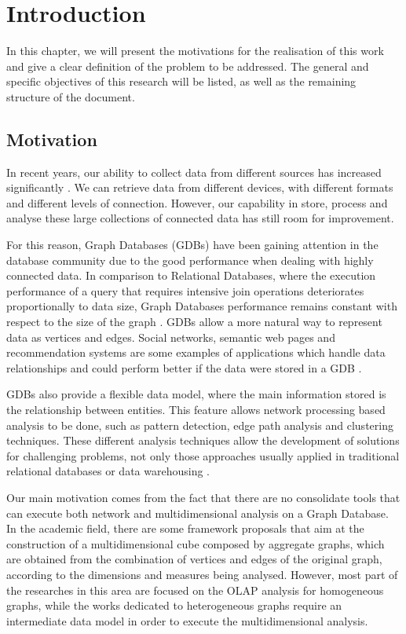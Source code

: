 \chapter{Introduction}
In this chapter, we will present the motivations for the realisation of this work and give a clear definition of the problem to be addressed. The general and specific objectives of this research will be listed, as well as the remaining structure of the document.

\section{Motivation}
In recent years, our ability to collect data from different sources has increased significantly \cite{fan2013mining}. We can retrieve data from different devices, with different formats and different levels of connection. However, our capability in store, process and analyse these large collections of connected data has still room for improvement.

For this reason, Graph Databases (GDBs) have been gaining attention in the database community due to the good performance when dealing with highly connected data. In comparison to Relational Databases, where the execution performance of a query that requires intensive join operations deteriorates proportionally to data size, Graph Databases performance remains constant with respect to the size of the graph \cite{Robinson2015}. GDBs allow a more natural way to represent data as vertices and edges. Social networks, semantic web pages and recommendation systems are some examples of applications which handle data relationships and could perform better if the data were stored in a GDB \cite{Miller2013}. 

GDBs also provide a flexible data model, where the main information stored is the relationship between entities. This feature allows network processing based analysis to be done, such as pattern detection, edge path analysis and clustering techniques. These different analysis techniques allow the development of solutions for challenging problems, not only those approaches usually applied in traditional relational databases or data warehousing \cite{Loshin2013}. 

Our main motivation comes from the fact that there are no consolidate tools that can execute both network and multidimensional analysis on a Graph Database. In the academic field, there are some framework proposals that aim at the construction of a multidimensional cube composed by aggregate graphs, which are obtained from the combination of vertices and edges of the original graph, according to the dimensions and measures being analysed. However, most part of the researches in this area are focused on the OLAP analysis for homogeneous graphs, while the works dedicated to heterogeneous graphs require an intermediate data model in order to execute the multidimensional analysis.

